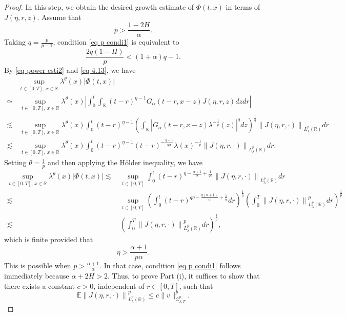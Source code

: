 \documentclass[11pt,reqno]{amsart}
\numberwithin{equation}{section}
\newcommand{\1}{{\bf 1}}
\newcommand{\2}{{\bf 2}}
\begin{document}
\begin{proof}
     In this step, we  obtain the desired growth estimate of $\Phi(t,x)$ in terms of $J(\eta,r,z)$. Assume that 
  \begin{equation}\label{eq p condi1}
  p>\frac{1-2H}{\alpha}.
    \end{equation}
    Taking $q=\frac{p}{p-1}$,  condition \eqref{eq p condi1}  is equivalent to $$\frac{2q(1-H)}{p}<(1+\alpha)q-1.$$
      By \eqref{eq power esti2} and   \eqref{eq 4.13}, we have
    \begin{align*}
   & \sup_{t\in[0,T],\,x\in\mathbb R} \lambda^{\theta}(x)\left|\Phi(t,x)\right|\\
     \simeq&\,  \sup_{t\in[0,T],\,x\in\mathbb R}\lambda^{\theta}(x)\left|\int_0^t\int_{\mathbb{R}}(t-r)^{\eta-1}G_{\alpha}(t-r,x-z)J(\eta,r,z)dzdr\right|\\
     \lesssim  &\,  \sup_{t\in[0,T],\,x\in\mathbb R}\lambda^{\theta}(x)\int_0^t(t-r)^{\eta-1}\left(\int_{\mathbb{R}}\left|G_{\alpha}(t-r,x-z)\lambda^{-\frac{1}{p}}(z)\right|^{q}dz\right)^{\frac{1}{q}}
    \left\|J(\eta,r,\cdot)\right\|_{L^p_{\lambda}(\mathbb{R})}dr\\
    \lesssim &\,   \sup_{t\in[0,T],\,x\in\mathbb R}\lambda^{\theta}(x)\int_0^t(t-r)^{\eta-1}(t-r)^{-\frac{q-1}{q\alpha}}\lambda(x)^{-\frac{1}{p}}\left\|J(\eta,r,\cdot)\right\|_{L^p_{\lambda}(\mathbb{R})}dr.
        \end{align*}
Setting $\theta=\frac1p$ and then applying the H\"older inequality, we  have
  \begin{equation}\label{eq 4.14}  
  \begin{split}
  \sup_{t\in[0,T],\,x\in\mathbb R}\lambda^{\theta}(x)\left|\Phi(t,x)\right| 
\lesssim &\,  \sup_{t\in[0,T]}\int_0^t(t-r)^{\eta-\frac{\alpha+1}{\alpha}+\frac{1}{q\alpha}}\left\|J(\eta,r,\cdot)\right\|_{L^p_{\lambda}(\mathbb{R})}dr \\
    \lesssim  &\,   \sup_{t\in[0,T]}\left(\int_0^t(t-r)^{q\eta-\frac{q(\alpha+1)}{\alpha}+\frac{1}{\alpha}}dr\right)^{\frac1q}
   \left(\int_0^T\left\|J(\eta,r,\cdot)\right\|_{L^p_{\lambda}(\mathbb{R})}^pdr\right)^{\frac1p} \\
    \lesssim &\,   \left(\int_0^T\left\|J(\eta,r,\cdot)\right\|_{L^p_{\lambda}(\mathbb{R})}^pdr\right)^{\frac1p}, 
    \end{split}
    \end{equation}
   which is finite provided that 
   \begin{equation}\label{eq p condi2}
   \eta>\frac{\alpha+1}{p\alpha}.
   \end{equation}
   This is possible when $p>\frac{\alpha+1}{\alpha}$. In that case, condition \eqref{eq p condi1}  follows immediately because $\alpha+2H>2$.  Thus, to prove Part (i), it suffices to show that there exists a constant $c>0$, independent of $r\in[0,T]$, such that
   \begin{equation}\label{eq 4.16}
   \mathbb{E}\left\|J(\eta,r,\cdot)\right\|_{L^p_{\lambda}(\mathbb{R})}^p\le c\|v\|_{\mathcal{Z}_{\lambda,T}^p}^p.
   \end{equation}



\end{proof}
\end{document}
